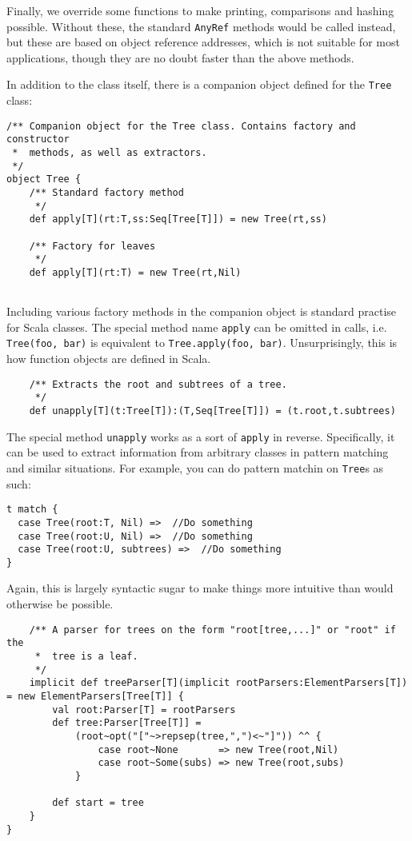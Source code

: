 Finally, we override some functions to make printing, comparisons and
hashing possible. Without these, the standard \texttt{AnyRef} methods would
be called instead, but these are based on object reference addresses, which
is not suitable for most applications, though they are no doubt faster than
the above methods. 

In addition to the class itself, there is a companion object defined for
the \texttt{Tree} class:
\begin{verbatim}
/** Companion object for the Tree class. Contains factory and constructor
 *  methods, as well as extractors.
 */
object Tree {
	/** Standard factory method
	 */
	def apply[T](rt:T,ss:Seq[Tree[T]]) = new Tree(rt,ss)
	
	/** Factory for leaves
	 */
	def apply[T](rt:T) = new Tree(rt,Nil)
	
\end{verbatim}

Including various factory methods in the companion object is standard
practise for Scala classes. The special method name \texttt{apply} can be
omitted in calls, i.e. \texttt{Tree(foo, bar)} is equivalent to
\texttt{Tree.apply(foo, bar)}. Unsurprisingly, this is how function objects
are defined in Scala. 

\begin{verbatim}
	/** Extracts the root and subtrees of a tree.
	 */
	def unapply[T](t:Tree[T]):(T,Seq[Tree[T]]) = (t.root,t.subtrees)
\end{verbatim}

The special method \texttt{unapply} works as a sort of \texttt{apply} in
reverse. Specifically, it can be used to extract information from arbitrary
classes in pattern matching and similar situations. For example, you can do
pattern matchin on \texttt{Tree}s as such:

\begin{verbatim}
t match {
  case Tree(root:T, Nil) =>  //Do something 
  case Tree(root:U, Nil) =>  //Do something
  case Tree(root:U, subtrees) =>  //Do something
}
\end{verbatim}

Again, this is largely syntactic sugar to make things more intuitive than
would otherwise be possible.

\begin{verbatim}
	/** A parser for trees on the form "root[tree,...]" or "root" if the
	 *  tree is a leaf. 
	 */
	implicit def treeParser[T](implicit rootParsers:ElementParsers[T]) = new ElementParsers[Tree[T]] {
		val root:Parser[T] = rootParsers
		def tree:Parser[Tree[T]] =
			(root~opt("["~>repsep(tree,",")<~"]")) ^^ {
				case root~None       => new Tree(root,Nil)
				case root~Some(subs) => new Tree(root,subs)
			}

		def start = tree
	}
}
\end{verbatim}

